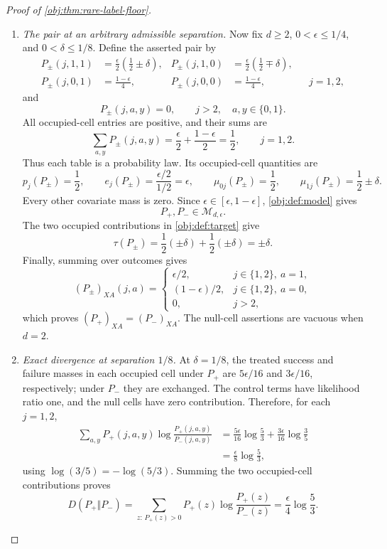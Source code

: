 \documentclass[11pt]{article}
\begin{document}
\begin{proof}[Proof of \cref{obj:thm:rare-label-floor}]
\begin{enumerate}
\item \textit{The pair at an arbitrary admissible separation.}
Now fix \(d\ge2\), \(0<\epsilon\le1/4\), and \(0<\delta\le1/8\).
Define the asserted pair by
\[
\begin{aligned}
P_\pm(j,1,1)&=\frac{\epsilon}{2}\left(\frac12\pm\delta\right),&
P_\pm(j,1,0)&=\frac{\epsilon}{2}\left(\frac12\mp\delta\right),\\
P_\pm(j,0,1)&=\frac{1-\epsilon}{4},&
P_\pm(j,0,0)&=\frac{1-\epsilon}{4},
&&j=1,2,
\end{aligned}
\]
and
\[
P_\pm(j,a,y)=0,
\qquad j>2,\quad a,y\in\{0,1\}.
\]
All occupied-cell entries are positive, and their sums are
\[
\sum_{a,y}P_\pm(j,a,y)
=
\frac{\epsilon}{2}+\frac{1-\epsilon}{2}
=\frac12,
\qquad j=1,2.
\]
Thus each table is a probability law. Its occupied-cell quantities are
\[
p_j(P_\pm)=\frac12,
\qquad
e_j(P_\pm)=\frac{\epsilon/2}{1/2}=\epsilon,
\qquad
\mu_{0j}(P_\pm)=\frac12,
\qquad
\mu_{1j}(P_\pm)=\frac12\pm\delta.
\]
Every other covariate mass is zero. Since
\(\epsilon\in[\epsilon,1-\epsilon]\), \cref{obj:def:model} gives
\[
P_+,P_-\in\mathcal M_{d,\epsilon}.
\]
The two occupied contributions in \cref{obj:def:target} give
\[
\tau(P_\pm)
=
\frac12(\pm\delta)+\frac12(\pm\delta)
=\pm\delta.
\]
Finally, summing over outcomes gives
\[
(P_\pm)_{XA}(j,a)=
\begin{cases}
\epsilon/2,&j\in\{1,2\},\ a=1,\\
(1-\epsilon)/2,&j\in\{1,2\},\ a=0,\\
0,&j>2,
\end{cases}
\]
which proves \((P_+)_{XA}=(P_-)_{XA}\). The null-cell assertions are
vacuous when \(d=2\).

\item \textit{Exact divergence at separation \(1/8\).}
At \(\delta=1/8\), the treated success and failure masses in each
occupied cell under \(P_+\) are \(5\epsilon/16\) and
\(3\epsilon/16\), respectively; under \(P_-\) they are exchanged.
The control terms have likelihood ratio one, and the null cells have
zero contribution. Therefore, for each \(j=1,2\),
\[
\begin{aligned}
\sum_{a,y}
P_+(j,a,y)\log\frac{P_+(j,a,y)}{P_-(j,a,y)}
&=
\frac{5\epsilon}{16}\log\frac53
+
\frac{3\epsilon}{16}\log\frac35\\
&=
\frac{\epsilon}{8}\log\frac53,
\end{aligned}
\]
using \(\log(3/5)=-\log(5/3)\). Summing the two occupied-cell
contributions proves
\[
D(P_+\Vert P_-)
=
\sum_{z:\,P_+(z)>0}
P_+(z)\log\frac{P_+(z)}{P_-(z)}
=
\frac{\epsilon}{4}\log\frac53.
\]
\end{enumerate}
\end{proof}
\end{document}
